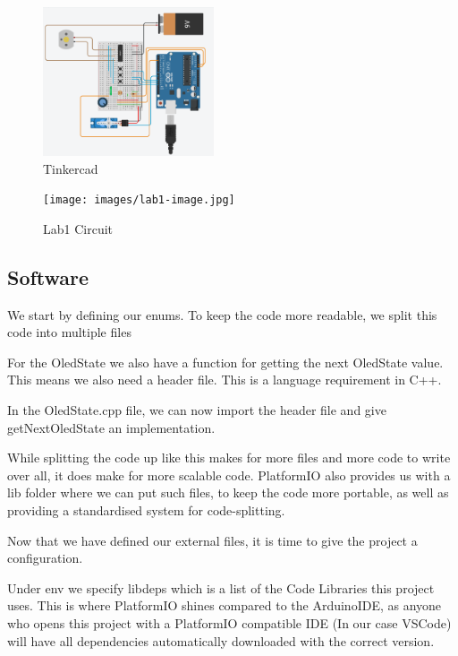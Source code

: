 \documentclass[journal]{IEEEtran}
\begin{document}
\begin{figure}[H]%
    \begin {center}
    \includegraphics[width=0.45\textwidth]{images/tinkercad.PNG}
    \caption{Tinkercad}
    \label{fig:tinkercad}
    \end {center}
\end{figure}

\begin{figure}[H]%
    \begin {center}
    \texttt{[image: images/lab1-image.jpg]}
    \caption{Lab1 Circuit}
    \label{fig:circuitPicture}
    \end {center}
\end{figure}

\vfill\null
\pagebreak

\subsection{Software}
We start by defining our enums. To keep the code more readable, we split this code into multiple files

For the OledState we also have a function for getting the next OledState value.
This means we also need a header file. This is a language requirement in C++.

In the OledState.cpp file, we can now import the header file and give getNextOledState an implementation.

While splitting the code up like this makes for more files and more code to write over all,
it does make for more scalable code. PlatformIO also provides us with a lib folder where we can put such files,
to keep the code more portable,
as well as providing a standardised system for code-splitting.

\vfill\null
\pagebreak

Now that we have defined our external files,
it is time to give the project a configuration.

Under env we specify lib\textunderscore deps which is a list of the Code Libraries this project
uses. This is where PlatformIO shines compared to the ArduinoIDE, as anyone who opens
this project with a PlatformIO compatible IDE (In our case VSCode) will have all dependencies
automatically downloaded with the correct version.\\
\end{document}
